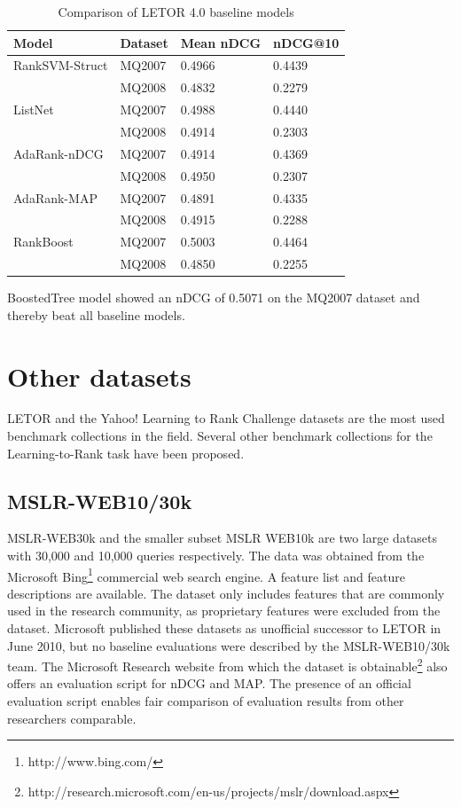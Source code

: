 \begin{table}
\begin{tabular}{l|lll}
Model & Dataset & Mean \ac{nDCG} & \ac{nDCG}@10 \\ 
\hline
Rank\ac{SVM}-Struct & MQ2007 & 0.4966 & 0.4439 \\ 
 & MQ2008 & 0.4832 & 0.2279 \\ 
\hline
ListNet & MQ2007 & 0.4988 & 0.4440 \\ 
 & MQ2008 & 0.4914 & 0.2303 \\ 
\hline
AdaRank-\ac{nDCG} & MQ2007 & 0.4914 & 0.4369 \\ 
 & MQ2008 & 0.4950 & 0.2307 \\ 
\hline
AdaRank-\ac{MAP} & MQ2007 & 0.4891 & 0.4335 \\ 
 & MQ2008 & 0.4915 & 0.2288 \\ 
\hline
RankBoost & MQ2007 & 0.5003 & 0.4464 \\ 
 & MQ2008 & 0.4850 & 0.2255 \\ 
\end{tabular}
\caption{Comparison of LETOR 4.0 baseline models}
\label{tab:letor4_baseline_results}
\end{table}

BoostedTree model \cite{Kocsis2013} showed an \ac{nDCG} of 0.5071 on the MQ2007 dataset and thereby beat all baseline models.

\section{Other datasets}
LETOR and the Yahoo! Learning to Rank Challenge datasets are the most used benchmark collections in the field. Several other benchmark collections for the Learning-to-Rank task have been proposed.

\subsection{MSLR-WEB10/30k}
MSLR-WEB30k and the smaller subset MSLR WEB10k are two large datasets with 30,000 and 10,000 queries respectively. The data was obtained from the Microsoft Bing\footnote{http://www.bing.com/} commercial web search engine. A feature list and feature descriptions are available. The dataset only includes features that are commonly used in the research community, as proprietary features were excluded from the dataset. Microsoft published these datasets as unofficial successor to LETOR in June 2010, but no baseline evaluations were described by the MSLR-WEB10/30k team. The Microsoft Research website from which the dataset is obtainable\footnote{http://research.microsoft.com/en-us/projects/mslr/download.aspx} also offers an evaluation script for \ac{nDCG} and \ac{MAP}. The presence of an official evaluation script enables fair comparison of evaluation results from other researchers comparable.

